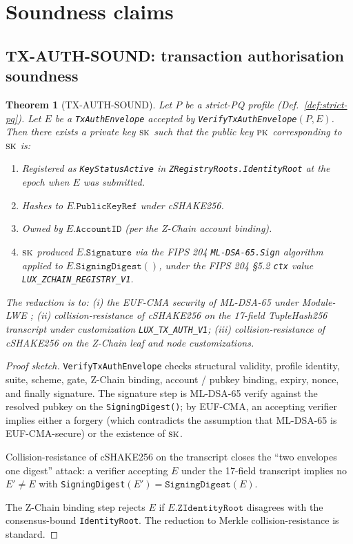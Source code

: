 \documentclass[11pt,a4paper]{article}
\newtheorem{theorem}{Theorem}
\begin{document}
\section{Soundness claims}

\subsection{TX-AUTH-SOUND: transaction authorisation soundness}

\begin{theorem}[TX-AUTH-SOUND]
\label{thm:tx-auth-sound}
Let $P$ be a strict-PQ profile (Def.~\ref{def:strict-pq}). Let $E$ be a
\texttt{TxAuthEnvelope} accepted by \texttt{VerifyTxAuthEnvelope}$(P, E)$.
Then there exists a private key $\textsc{sk}$ such that the public key
$\textsc{pk}$ corresponding to $\textsc{sk}$ is:
\begin{enumerate}[leftmargin=2em,nosep]
  \item Registered as \texttt{KeyStatusActive} in
    \texttt{ZRegistryRoots.IdentityRoot} at the epoch when $E$ was
    submitted.
  \item Hashes to $E.\texttt{PublicKeyRef}$ under cSHAKE256.
  \item Owned by $E.\texttt{AccountID}$ (per the Z-Chain account
    binding).
  \item $\textsc{sk}$ produced $E.\texttt{Signature}$ via the FIPS 204
    \texttt{ML-DSA-65.Sign} algorithm applied to
    $E.\texttt{SigningDigest}()$, under the FIPS 204 \S 5.2
    \texttt{ctx} value \texttt{LUX\_ZCHAIN\_REGISTRY\_V1}.
\end{enumerate}
The reduction is to: (i) the EUF-CMA security of ML-DSA-65 under
Module-LWE \cite{fips204,dilithium}; (ii) collision-resistance of cSHAKE256
on the 17-field TupleHash256 transcript under customization
\texttt{LUX\_TX\_AUTH\_V1}; (iii) collision-resistance of cSHAKE256 on the
Z-Chain leaf and node customizations.
\end{theorem}

\begin{proof}[Proof sketch]
\texttt{VerifyTxAuthEnvelope} checks structural validity, profile
identity, suite, scheme, gate, Z-Chain binding, account / pubkey
binding, expiry, nonce, and finally signature. The signature step is
ML-DSA-65 verify against the resolved pubkey on the
\texttt{SigningDigest()}; by EUF-CMA, an accepting verifier implies
either a forgery (which contradicts the assumption that ML-DSA-65 is
EUF-CMA-secure) or the existence of $\textsc{sk}$.

Collision-resistance of cSHAKE256 on the transcript closes the
``two envelopes one digest'' attack: a verifier accepting $E$ under the
17-field transcript implies no $E' \ne E$ with
\texttt{SigningDigest}$(E') = \texttt{SigningDigest}(E)$.

The Z-Chain binding step rejects $E$ if $E.\texttt{ZIdentityRoot}$
disagrees with the consensus-bound \texttt{IdentityRoot}. The reduction
to Merkle collision-resistance is standard.
\end{proof}
\end{document}
